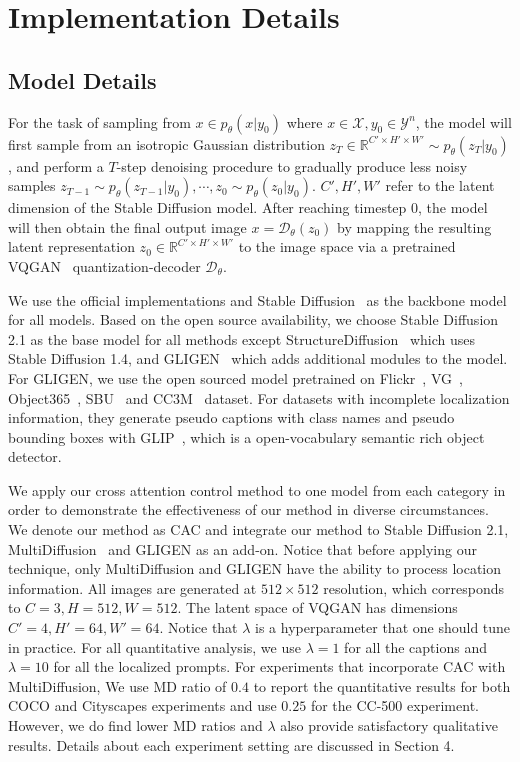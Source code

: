 
\section{Implementation Details}
\subsection{Model Details}
For the task of sampling from $x \in p_\theta(x|y_0)$ where $x \in \mathcal{X}, y_0 \in \mathcal{Y}^n$, the model will first sample from an isotropic Gaussian distribution $z_T \in \mathbb{R}^{C'\times H'\times W'} \sim p_\theta(z_{T}|y_0)$, and perform a $T$-step denoising procedure to gradually produce less noisy samples $z_{T-1} \sim p_\theta(z_{T-1}|y_0), \cdots, z_{0} \sim p_\theta(z_{0}|y_0)$. $C',H',W'$ refer to the latent dimension of the Stable Diffusion model. After reaching timestep $0$, the model will then obtain the final output image $x = \mathcal{D}_\theta(z_0)$ by mapping the resulting latent representation $z_0 \in \mathbb{R}^{C'\times H'\times W'}$ to the image space via a pretrained VQGAN~\citep{vqgan} quantization-decoder $\mathcal{D}_\theta$.

We use the official implementations and Stable Diffusion~\citep{stablediffusion} as the backbone model for all models. Based on the open source availability, we choose Stable Diffusion 2.1 as the base model for all methods except StructureDiffusion~\citep{structurediffusion} which uses Stable Diffusion 1.4, and GLIGEN~\citep{gligen} which adds additional modules to the model. For GLIGEN, we use the open sourced model pretrained on Flickr~\citep{flickr}, VG~\citep{vg}, Object365~\citep{object365}, SBU~\citep{sbu} and CC3M~\citep{cc3m} dataset. For datasets with incomplete localization information, they generate pseudo captions with class names and pseudo bounding boxes with GLIP~\citep{glip}, which is a open-vocabulary semantic rich object detector. 

We apply our cross attention control method to one model from each category in order to demonstrate the effectiveness of our method in diverse circumstances. We denote our method as CAC and integrate our method to Stable Diffusion 2.1, MultiDiffusion~\citep{multidiffusion} and GLIGEN as an add-on. Notice that before applying our technique, only MultiDiffusion and GLIGEN have the ability to process location information. All images are generated at $512\times 512$ resolution, which corresponds to $C = 3, H = 512, W = 512$. The latent space of VQGAN has dimensions $C' = 4, H' = 64, W' = 64$. Notice that $\lambda$ is a hyperparameter that one should tune in practice. For all quantitative analysis, we use $\lambda = 1$ for all the captions and $\lambda = 10$ for all the localized prompts. For experiments that incorporate CAC with MultiDiffusion, We use MD ratio of $0.4$ to report the quantitative results for both COCO and Cityscapes experiments and use $0.25$ for the CC-500 experiment. However, we do find lower MD ratios and $\lambda$ also provide satisfactory qualitative results. Details about each experiment setting are discussed in Section 4.

